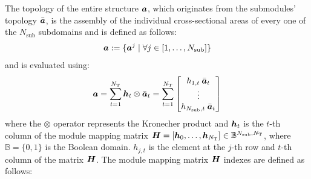 The topology of the entire structure $\bm{a}$, which originates from the submodules' topology $\bar{\bm{a}}$, is the assembly of the individual cross-sectional areas of every one of the $N_{\text{sub}}$ subdomains and is defined as follows:
\begin{equation}
    \bm{a} :=  \{\bm{a}^j \;|\; \forall j \in [1,\dots,N_{\text{sub}}]\}
\end{equation}
and is evaluated using:
\begin{equation}
    \bm{a} = \sum_{t=1}^{N_\text{T}} \bm{h}_t\otimes\bar{\bm{a}}_t = \sum_{t=1}^{N_\text{T}} \begin{bmatrix}
        h_{1,t} \: \bar{\bm{a}}_t \\
        \vdots\\
        h_{N_{\text{sub}},t} \: \bar{\bm{a}}_t 
        \end{bmatrix}
        \label{eq:05_VL}
\end{equation}
where the $\otimes$ operator represents the Kronecher product and $\bm{h}_{t}$ is the $t$-th column of the module mapping matrix $\bm{H} = [\bm{h}_0,\dots,\bm{h}_{N_\text{T}}] \in \mathbb{B}^{N_{\text{sub}},N_\text{T}}$, where $\mathbb{B}=\lbrace 0,1 \rbrace$ is the Boolean domain. $h_{j,t}$ is the element at the $j$-th row and $t$-th column of the matrix $\bm{H}$. The module mapping matrix $\bm{H}$ indexes are defined as follows:
